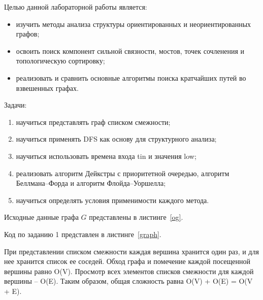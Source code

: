 
Целью данной лабораторной работы является:
\begin{itemize}
	\item изучить методы анализа структуры ориентированных и неориентированных графов;
	\item освоить поиск компонент сильной связности, мостов, точек сочленения и топологическую сортировку;
	\item реализовать и сравнить основные алгоритмы поиска кратчайших путей во взвешенных графах.
\end{itemize}

Задачи:
\begin{enumerate}
	\item научиться представлять граф списком смежности;
	\item научиться применять DFS как основу для структурного анализа;
	\item научиться использовать времена входа tin и значения low;
	\item реализовать алгоритм Дейкстры с приоритетной очередью, алгоритм Беллмана–Форда и алгоритм Флойда–Уоршелла;
	\item научиться определять условия применимости каждого метода.
\end{enumerate}


Исходные данные графа $G$ представлены в листинге~\ref{og}.




Код по заданию 1 представлен в листинге~\ref{graph}.



При представлении списком смежности каждая вершина хранится один раз, и для нее хранится список ее соседей.
Обход графа и помечение каждой посещенной вершины равно O(V).
Просмотр всех элементов списков смежности для каждой вершины -- O(E).
Таким образом, общая сложность равна O(V) + O(E) = O(V + E).

